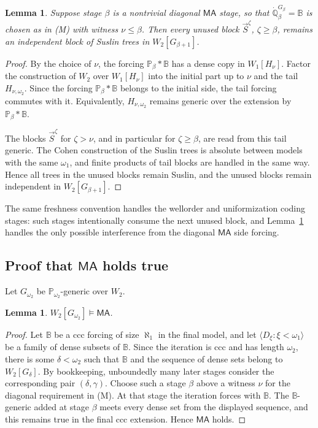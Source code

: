 \documentclass[a4paper,11pt]{article}
\newtheorem{lemma}[theorem]{Lemma}
\newcommand{\forceP}{\mathbb{P}}
\newcommand{\forceQ}{\mathbb{Q}}
\begin{document}
\begin{lemma}\label{lemma:tail-preservation-ma-stages}
Suppose stage $\beta$ is a nontrivial diagonal $\mathsf{MA}$ stage, so that $\dot{\forceQ}_\beta^{G_\beta}=\mathbb B$ is chosen as in \textup{(M)} with witness $\nu\leq\beta$.  Then every unused block $\vec S^{\zeta}$, $\zeta\geq\beta$, remains an independent block of Suslin trees in $W_2[G_{\beta+1}]$.
\end{lemma}

\begin{proof}
By the choice of $\nu$, the forcing $\forceP_\beta\ast\mathbb B$ has a dense copy in $W_1[H_\nu]$.  Factor the construction of $W_2$ over $W_1[H_\nu]$ into the initial part up to $\nu$ and the tail $H_{\nu,\omega_2}$.  Since the forcing $\forceP_\beta\ast\mathbb B$ belongs to the initial side, the tail forcing commutes with it.  Equivalently, $H_{\nu,\omega_2}$ remains generic over the extension by $\forceP_\beta\ast\mathbb B$.

The blocks $\vec S^\zeta$ for $\zeta>\nu$, and in particular for $\zeta\geq\beta$, are read from this tail generic.  The Cohen construction of the Suslin trees is absolute between models with the same $\omega_1$, and finite products of tail blocks are handled in the same way.  Hence all trees in the unused blocks remain Suslin, and the unused blocks remain independent in $W_2[G_{\beta+1}]$.
\end{proof}

The same freshness convention handles the wellorder and uniformization coding stages: such stages intentionally consume the next unused block, and Lemma~\ref{lemma:tail-preservation-ma-stages} handles the only possible interference from the diagonal $\mathsf{MA}$ side forcing.

\subsection{Proof that $\mathsf{MA}$ holds true}

Let $G_{\omega_2}$ be $\forceP_{\omega_2}$-generic over $W_2$.

\begin{lemma}\label{lemma:ma-final-model}
$W_2[G_{\omega_2}]\models\mathsf{MA}$.
\end{lemma}

\begin{proof}
Let $\mathbb B$ be a ccc forcing of size $\aleph_1$ in the final model, and let $\langle D_\xi:\xi<\omega_1\rangle$ be a family of dense subsets of $\mathbb B$.  Since the iteration is ccc and has length $\omega_2$, there is some $\delta<\omega_2$ such that $\mathbb B$ and the sequence of dense sets belong to $W_2[G_\delta]$.  By bookkeeping, unboundedly many later stages consider the corresponding pair $(\delta,\gamma)$.  Choose such a stage $\beta$ above a witness $\nu$ for the diagonal requirement in \textup{(M)}.  At that stage the iteration forces with $\mathbb B$.  The $\mathbb B$-generic added at stage $\beta$ meets every dense set from the displayed sequence, and this remains true in the final ccc extension.  Hence $\mathsf{MA}$ holds.
\end{proof}
\end{document}
